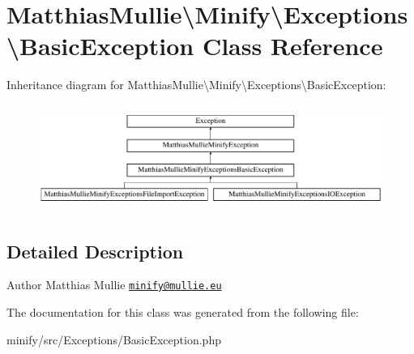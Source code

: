 \hypertarget{classMatthiasMullie_1_1Minify_1_1Exceptions_1_1BasicException}{}\section{Matthias\+Mullie\textbackslash{}Minify\textbackslash{}Exceptions\textbackslash{}Basic\+Exception Class Reference}
\label{classMatthiasMullie_1_1Minify_1_1Exceptions_1_1BasicException}
Inheritance diagram for Matthias\+Mullie\textbackslash{}Minify\textbackslash{}Exceptions\textbackslash{}Basic\+Exception\+:\begin{figure}[H]
\begin{center}
\leavevmode
\includegraphics[height=3.510972cm]{classMatthiasMullie_1_1Minify_1_1Exceptions_1_1BasicException}
\end{center}
\end{figure}


\subsection{Detailed Description}
\begin{DoxyAuthor}{Author}
Matthias Mullie \href{mailto:minify@mullie.eu}{\tt minify@mullie.\+eu} 
\end{DoxyAuthor}


The documentation for this class was generated from the following file\+:\begin{DoxyCompactItemize}
\item 
minify/src/\+Exceptions/Basic\+Exception.\+php\end{DoxyCompactItemize}
